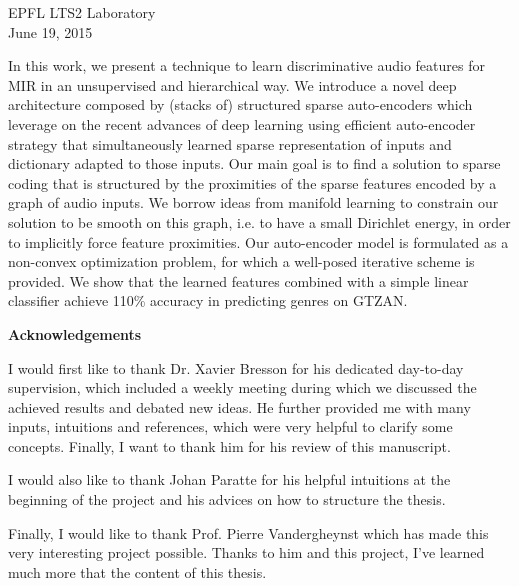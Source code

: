 \documentclass[a4paper,12pt,oneside]{report}
\begin{document}
\begin{titlepage}
\begin{center}
		\vspace{1.5cm}
		\large EPFL LTS2 Laboratory\\
		\vspace{0.8cm}
		\large June 19, 2015
		
	\end{center}
	
\end{titlepage}



\def\abstract{
	\vfil
	\begin{center}
		{\bfseries \abstractname\vspace{-.5em}}
	\end{center}
	\quotation
}
\def\endabstract{\par
	\endquotation
}

\pagestyle{empty}
\begin{abstract}
	In this work, we present a technique to learn discriminative audio features for \gls{MIR} in an unsupervised and hierarchical way. We introduce a novel deep architecture composed by (stacks of) structured sparse auto-encoders which leverage on the recent advances of deep learning using efficient auto-encoder strategy that simultaneously learned sparse representation of inputs and dictionary adapted to those inputs. Our main goal is to find a solution to sparse coding that is structured by the proximities of the sparse features encoded by a graph of audio inputs. We borrow ideas from manifold learning to constrain our solution to be smooth on this graph, i.e. to have a small Dirichlet energy, in order to implicitly force feature proximities. Our auto-encoder model is formulated as a non-convex optimization problem, for which a {\color{red}well-posed} iterative scheme is provided. We show that the learned features combined with a simple linear classifier achieve {\color{red}110\%} accuracy in predicting genres on GTZAN.
\end{abstract}

\renewcommand{\abstractname}{Acknowledgements}
\begin{abstract}
	I would first like to thank Dr. Xavier Bresson for his dedicated day-to-day supervision, which included a weekly meeting during which we discussed the achieved results and debated new ideas. He further provided me with many inputs, intuitions and references, which were very helpful to clarify some concepts. Finally, I want to thank him for his review of this manuscript.

	I would also like to thank Johan Paratte for his helpful intuitions at the beginning of the project and his advices on how to structure the thesis.

	Finally, I would like to thank Prof. Pierre Vandergheynst which has made this very interesting project possible. Thanks to him and this project, I've learned much more that the content of this thesis.
\end{abstract}
\end{document}

